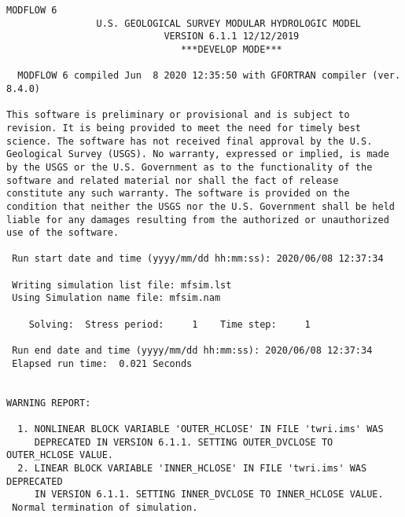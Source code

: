 {\small
\begin{lstlisting}[style=modeloutput]
                                   MODFLOW 6
                U.S. GEOLOGICAL SURVEY MODULAR HYDROLOGIC MODEL
                            VERSION 6.1.1 12/12/2019
                               ***DEVELOP MODE***

  MODFLOW 6 compiled Jun  8 2020 12:35:50 with GFORTRAN compiler (ver. 8.4.0)

This software is preliminary or provisional and is subject to 
revision. It is being provided to meet the need for timely best 
science. The software has not received final approval by the U.S. 
Geological Survey (USGS). No warranty, expressed or implied, is made 
by the USGS or the U.S. Government as to the functionality of the 
software and related material nor shall the fact of release 
constitute any such warranty. The software is provided on the 
condition that neither the USGS nor the U.S. Government shall be held 
liable for any damages resulting from the authorized or unauthorized 
use of the software.

 Run start date and time (yyyy/mm/dd hh:mm:ss): 2020/06/08 12:37:34

 Writing simulation list file: mfsim.lst
 Using Simulation name file: mfsim.nam

    Solving:  Stress period:     1    Time step:     1

 Run end date and time (yyyy/mm/dd hh:mm:ss): 2020/06/08 12:37:34
 Elapsed run time:  0.021 Seconds


WARNING REPORT:

  1. NONLINEAR BLOCK VARIABLE 'OUTER_HCLOSE' IN FILE 'twri.ims' WAS
     DEPRECATED IN VERSION 6.1.1. SETTING OUTER_DVCLOSE TO OUTER_HCLOSE VALUE.
  2. LINEAR BLOCK VARIABLE 'INNER_HCLOSE' IN FILE 'twri.ims' WAS DEPRECATED
     IN VERSION 6.1.1. SETTING INNER_DVCLOSE TO INNER_HCLOSE VALUE.
 Normal termination of simulation.
\end{lstlisting}
}
